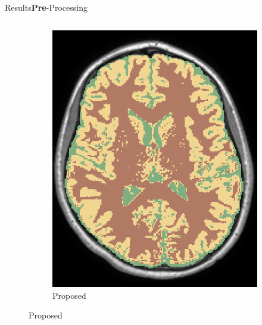 \documentclass[]{standalone}
\begin{document}
\begin{frame}{Results}{\textbf{Pre}-Processing}
\begin{columns}
\begin{column}{0.67\textwidth}
\begin{figure}[h!]
\begin{subfigure}{0.32\textwidth}
					\includegraphics[scale=0.11]{./IMG/SEG48.png}
					\caption*{\tiny Proposed}
				\end{subfigure}
			\end{figure}
		\end{column}
	\end{columns}
	
	\end{frame}
\end{document}
